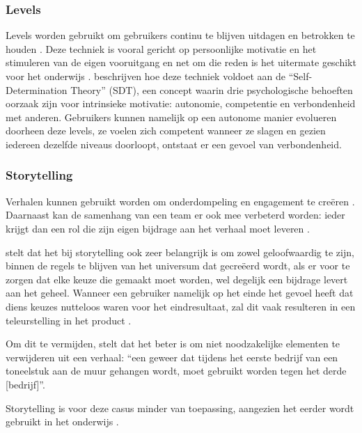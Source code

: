 \subsubsection{Levels}
\label{sssec:levels}
Levels worden gebruikt om gebruikers continu te blijven uitdagen en betrokken te houden \autocite{Dong2012}. Deze techniek is vooral gericht op persoonlijke motivatie en het stimuleren van de eigen vooruitgang en net om die reden is het uitermate geschikt voor het onderwijs \autocite{ManzanoLeon2021}.
\textcite{ManzanoLeon2021} beschrijven hoe deze techniek voldoet aan de ``Self-Determination Theory'' (SDT), een concept waarin drie psychologische behoeften oorzaak zijn voor intrinsieke motivatie: autonomie, competentie en verbondenheid met anderen. Gebruikers kunnen namelijk op een autonome manier evolueren doorheen deze levels, ze voelen zich competent wanneer ze slagen en gezien iedereen dezelfde niveaus doorloopt, ontstaat er een gevoel van verbondenheid.

\subsubsection{Storytelling}
Verhalen kunnen gebruikt worden om onderdompeling en engagement te creëren \autocite{ManzanoLeon2021}. Daarnaast kan de samenhang van een team er ook mee verbeterd worden: ieder krijgt dan een rol die zijn eigen bijdrage aan het verhaal moet leveren \autocite{ManzanoLeon2021}.

\textcite{Marczewski2015} stelt dat het bij storytelling ook zeer belangrijk is om zowel geloofwaardig te zijn, binnen de regels te blijven van het universum dat gecreëerd wordt, als er voor te zorgen dat elke keuze die gemaakt moet worden, wel degelijk een bijdrage levert aan het geheel. Wanneer een gebruiker namelijk op het einde het gevoel heeft dat diens keuzes nutteloos waren voor het eindresultaat, zal dit vaak resulteren in een teleurstelling in het product \autocite{Marczewski2015}.

Om dit te vermijden, stelt \textcite{Duster1990} dat het beter is om niet noodzakelijke elementen te verwijderen uit een verhaal: ``een geweer dat tijdens het eerste bedrijf van een toneelstuk aan de muur gehangen wordt, moet gebruikt worden tegen het derde [bedrijf]''.

Storytelling is voor deze casus minder van toepassing, aangezien het eerder wordt gebruikt in het onderwijs \autocite{Schmoelz2018}.

